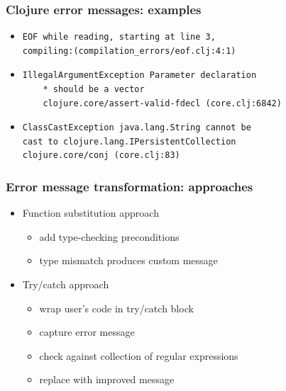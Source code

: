 \documentclass{beamer}
\begin{document}
\begin{frame}[fragile]
\frametitle{Clojure error messages: examples}

\begin{itemize}
	\item \begin{verbatim}
EOF while reading, starting at line 3, 
compiling:(compilation_errors/eof.clj:4:1)
\end{verbatim}

	\item \begin{verbatim}
IllegalArgumentException Parameter declaration
	* should be a vector 
	clojure.core/assert-valid-fdecl (core.clj:6842)
\end{verbatim}

\item \begin{verbatim}
ClassCastException java.lang.String cannot be
cast to clojure.lang.IPersistentCollection 
clojure.core/conj (core.clj:83)
\end{verbatim}

\end{itemize}

\end{frame}

\begin{frame}
\frametitle{Error message transformation: approaches}
	\begin{itemize}
	 	\item Function substitution approach
	 		\begin{itemize}
  	 			\item add type-checking preconditions
  	 			\item type mismatch produces custom message
	 		\end{itemize}
	 
		\item Try/catch approach
			\begin{itemize}
  				\item wrap user's code in try/catch block
  				\item capture error message
  				\item check against collection of regular expressions
  				\item replace with improved message
			\end{itemize}
	\end{itemize}
\end{frame}
\end{document}
